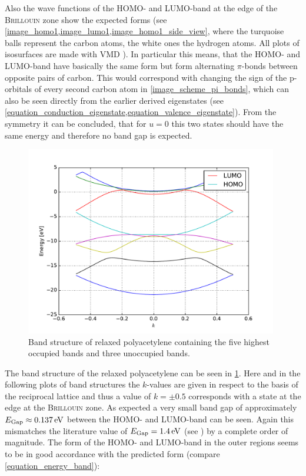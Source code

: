 Also the wave functions of the HOMO- and LUMO-band at the edge of the \textsc{Brillouin} zone show the expected forms (see \cref{image_homo1,image_lumo1,image_homo1_side_view}, where the turquoise balls represent the carbon atoms, the white ones the hydrogen atoms. All plots of isosurfaces are made with VMD \cite{HUMP96}). In particular this means, that the HOMO- and LUMO-band have basically the same form but form alternating $\pi$-bonds between opposite pairs of carbon. This would correspond with changing the sign of the p-orbitals of every second carbon atom in \cref{image_scheme_pi_bonds}, which can also be seen directly from the earlier derived eigenstates (see \cref{equation_conduction_eigenstate,equation_valence_eigenstate}). From the symmetry it can be concluded, that for $u=0$ this two states should have the same energy and therefore no band gap is expected.\\
\begin{figure}
	\centering
	\includegraphics[width = 11cm]{Images/polyacetylene/bands/band_structure}
	\caption{Band structure of relaxed polyacetylene containing the five highest occupied bands and three unoccupied bands.}
	\label{image_band_structure_relaxed_polyacetylene}
\end{figure}
The band structure of the relaxed polyacetylene can be seen in \cref{image_band_structure_relaxed_polyacetylene}. Here and in the following plots of band structures the $k$-values are given in respect to the basis of the reciprocal lattice and thus a value of $k = \pm 0.5$ corresponds with a state at the edge at the \textsc{Brillouin} zone. As expected a very small band gap of approximately $E_\text{Gap} \approx \unit[0.137]{eV}$ between the HOMO- and LUMO-band can be seen. Again this mismatches the literature value of $E_\text{Gap} = \unit[1.4]{eV}$ (see \cite{PhysRevLett.42.1698}) by a complete order of magnitude. The form of the HOMO- and LUMO-band in the outer regions seems to be in good accordance with the predicted form (compare \cref{equation_energy_band}):
